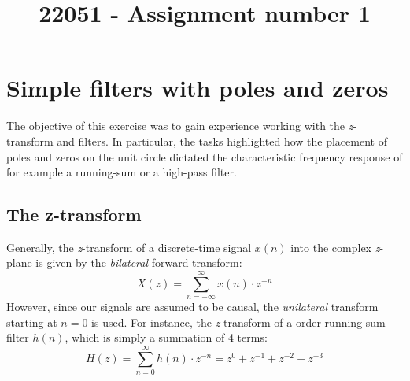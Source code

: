 \documentclass[journal]{IEEEtran}
\begin{document}
\title{22051 - Assignment number 1}
\author{\vspace{-10mm}}

\maketitle

\section{Simple filters with poles and zeros}
The objective of this exercise was to gain experience working with the \textit{z}-transform and filters. In particular, the tasks highlighted how the placement of poles and zeros on the unit circle dictated the characteristic frequency response of for example a running-sum or a high-pass filter.
\subsection{The z-transform}
Generally, the \textit{z}-transform of a discrete-time signal $x(n)$ into the complex \textit{z}-plane is given by the \textit{bilateral} forward transform: 
\begin{equation}
\label{eqn:z_transform}
    X(z) = \sum_{n=-\infty}^{\infty} x(n) \cdot z^{-n}
\end{equation}
However, since our signals are assumed to be causal, the \textit{unilateral} transform starting at $n=0$ is used. For instance, the \textit{z}-transform of a  order running sum filter $h(n)$, which is simply a summation of 4 terms: 
\begin{equation}
\label{eqn:third_order_rs}
    H(z) = \sum_{n=0}^{\infty} h(n) \cdot z^{-n} = z^{0} + z^{-1} + z^{-2} + z^{-3} 
\end{equation}
\end{document}
